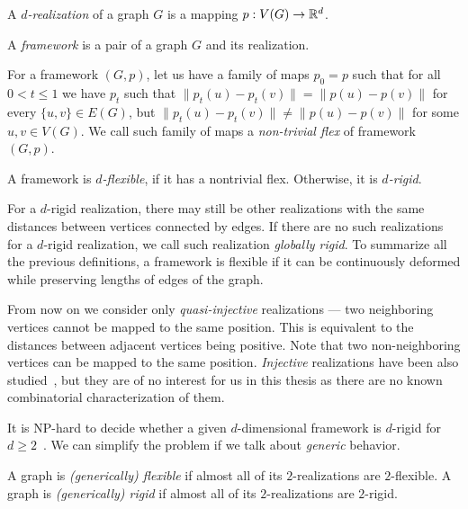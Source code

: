 %
\begin{definition}[\( d \)-realization]
	A \emph{\( d \)-realization} of a graph \( G \) is a mapping \( p: V(G) \to \mathbb{R}^d \).
\end{definition}
%
\begin{definition}[Framework]
	A \emph{framework} is a pair of a graph \( G \) and its realization.
\end{definition}
%
\begin{definition}
	For a framework \( (G, p) \),
	let us have a family of maps \( p_0 = p \) such that for all \( 0 < t \le 1 \)
	we have \( p_t \) such that
	\( \|p_t(u) - p_t(v)\| = \|p(u) - p(v)\|\) for every \( \{u, v\} \in E(G) \),
	but \( \|p_t(u) - p_t(v)\| \ne \|p(u) - p(v)\| \) for some \( u, v \in V (G) \).
	We call such family of maps a \emph{non-trivial flex} of framework \( (G, p) \).
\end{definition}
%
\begin{definition}
	A framework is \emph{\( d \)-flexible}, if it has a nontrivial flex.
	Otherwise, it is \emph{\( d \)-rigid}.
\end{definition}
%
For a \( d \)-rigid realization, there may still be other realizations
with the same distances between vertices connected by edges.
If there are no such realizations for a \( d \)-rigid realization,
we call such realization \emph{globally rigid}.
To summarize all the previous definitions,
a framework is flexible if it can be continuously deformed
while preserving lengths of edges of the graph.

From now on we consider only \emph{quasi-injective} realizations ---
two neighboring vertices cannot be mapped to the same position.
This is equivalent to the distances between adjacent vertices being positive.
Note that two non-neighboring vertices can be mapped to the same position.
\emph{Injective} realizations have been also studied~\cite{injective_realizations},
but they are of no interest for us in this thesis
as there are no known combinatorial characterization of them.

It is NP-hard to decide whether a given \( d \)-dimensional framework is
\( d \)-rigid for \( d \ge 2 \)~\cite{d_rigidity_hardness}.
We can simplify the problem if we talk about \emph{generic}
behavior.
%
\begin{definition}
	A graph is \emph{(generically) flexible} if almost all of
	its \( 2 \)-realizations are \( 2 \)-flexible.
	A graph is \emph{(generically) rigid} if almost all of
	its \( 2 \)-realizations are \( 2 \)-rigid.
\end{definition}
%

